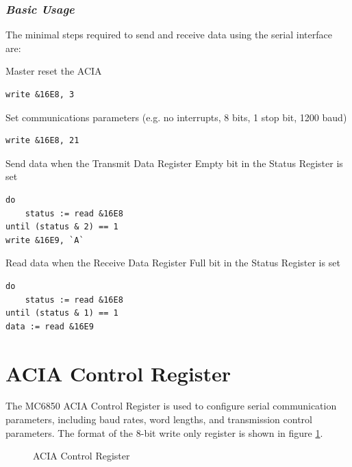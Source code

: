 \documentclass[a4paper,11pt,twoside,openright]{report}
\renewcommand{\arraystretch}{1.1}
\begin{document}
\subsubsection*{\textit{Basic Usage}}
The minimal steps required to send and receive data using the serial interface are:
\clearpage
\begin{enumerate}
\item Master reset the ACIA
\begin{lstlisting}[basicstyle=\footnotesize\ttfamily,frame=single]
write &16E8, 3
\end{lstlisting}
\item Set communications parameters (e.g. no interrupts, 8 bits, 1 stop bit, 1200 baud)
\begin{lstlisting}[basicstyle=\footnotesize\ttfamily,frame=single]
write &16E8, 21
\end{lstlisting}
\item Send data when the Transmit Data Register Empty bit in the Status Register is set
\begin{lstlisting}[basicstyle=\footnotesize\ttfamily,frame=single]
do
    status := read &16E8
until (status & 2) == 1
write &16E9, `A`
\end{lstlisting}
\begin{minipage}{\linewidth}
\item Read data when the Receive Data Register Full bit in the Status Register is set
\begin{lstlisting}[basicstyle=\footnotesize\ttfamily,frame=single]
do
    status := read &16E8
until (status & 1) == 1
data := read &16E9
\end{lstlisting}
\end{minipage}
\end{enumerate}



\section*{ACIA Control Register}
The MC6850 ACIA Control Register is used to configure serial communication parameters, including baud rates, word lengths, and transmission control parameters. The format of the 8-bit write only register is shown in figure \ref{fig:control}.

\begin{figure}[H]
\renewcommand{\arraystretch}{1.2}
\centering	
{}
\caption{ACIA Control Register}
\label{fig:control}
\end{figure}
\end{document}
